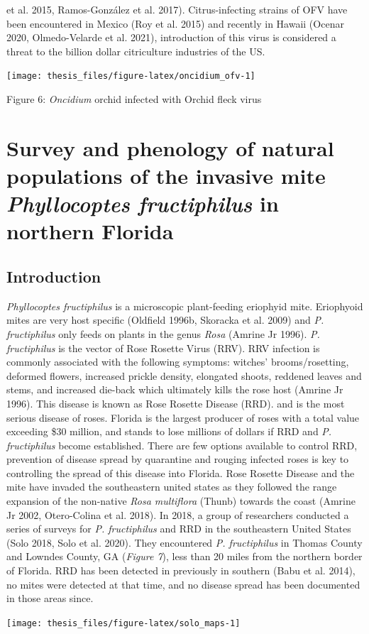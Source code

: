 \documentclass[12pt,final,CPage]{ufthesis}
\begin{document}
{et al. 2015, Ramos-González et al. 2017). Citrus-infecting strains of OFV have been encountered in Mexico (Roy et al. 2015) and recently in Hawaii (Ocenar 2020, Olmedo-Velarde et al. 2021), introduction of this virus is considered a threat to the billion dollar citriculture industries of the US.
  \begin{center}\texttt{[image: thesis\_files/figure-latex/oncidium\_ofv-1]} \end{center}

  Figure 6: \emph{Oncidium} orchid infected with Orchid fleck virus

  \hypertarget{survey-pheno}{%
  \chapter{\texorpdfstring{Survey and phenology of natural populations of the invasive mite \emph{Phyllocoptes fructiphilus} in northern Florida}{Survey and phenology of natural populations of the invasive mite Phyllocoptes fructiphilus in northern Florida}}\label{survey-pheno}}

  \hypertarget{intro-survey-pheno}{%
  \section{Introduction}\label{intro-survey-pheno}}

  \emph{Phyllocoptes fructiphilus} is a microscopic plant-feeding eriophyid mite. Eriophyoid mites are very host specific (Oldfield 1996b, Skoracka et al. 2009) and \emph{P. fructiphilus} only feeds on plants in the genus \emph{Rosa} (Amrine Jr 1996). \emph{P. fructiphilus} is the vector of Rose Rosette Virus (RRV). RRV infection is commonly associated with the following symptoms: witches' brooms/rosetting, deformed flowers, increased prickle density, elongated shoots, reddened leaves and stems, and increased die-back which ultimately kills the rose host (Amrine Jr 1996). This disease is known as Rose Rosette Disease (RRD). and is the most serious disease of roses. Florida is the largest producer of roses with a total value exceeding \$30 million, and stands to lose millions of dollars if RRD and \emph{P. fructiphilus} become established. There are few options available to control RRD, prevention of disease spread by quarantine and rouging infected roses is key to controlling the spread of this disease into Florida. Rose Rosette Disease and the mite have invaded the southeastern united states as they followed the range expansion of the non-native \emph{Rosa multiflora} (Thunb) towards the coast (Amrine Jr 2002, Otero-Colina et al. 2018). In 2018, a group of researchers conducted a series of surveys for \emph{P. fructiphilus} and RRD in the southeastern United States (Solo 2018, Solo et al. 2020). They encountered \emph{P. fructiphilus} in Thomas County and Lowndes County, GA (\emph{Figure 7}), less than 20 miles from the northern border of Florida. RRD has been detected in previously in southern (Babu et al. 2014), no mites were detected at that time, and no disease spread has been documented in those areas since.
  \begin{center}\texttt{[image: thesis\_files/figure-latex/solo\_maps-1]} \end{center}

}
\end{document}
